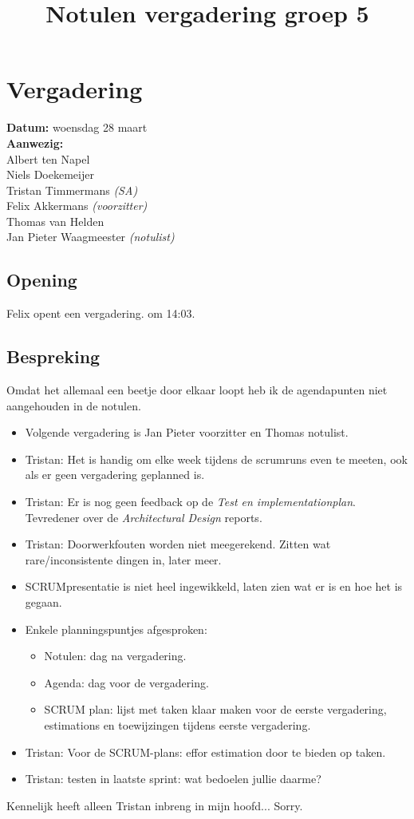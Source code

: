 \documentclass[a4paper]{article}
\title{ Notulen vergadering groep 5 }
\begin{document}
\maketitle

\section*{Vergadering}
{\bf Datum:} woensdag 28 maart \\
{\bf Aanwezig:}\\
Albert ten Napel  \\
Niels Doekemeijer  \\
Tristan Timmermans {\it (SA)} \\
Felix Akkermans {\it (voorzitter)} \\
Thomas van Helden \\
Jan Pieter Waagmeester {\it (notulist)}\\

\subsection*{Opening}
Felix opent een vergadering. om 14:03.

\subsection*{Bespreking}
{\small Omdat het allemaal een beetje door elkaar loopt heb ik de agendapunten niet aangehouden in de notulen.}


\begin{itemize}
	\item Volgende vergadering is Jan Pieter voorzitter en Thomas notulist.
	\item Tristan: Het is handig om elke week tijdens de scrumruns even te meeten, ook als er geen vergadering geplanned is.
	\item Tristan: Er is nog geen feedback op de \textit{Test en implementationplan}. Tevredener over de \textit{Architectural Design} reports.
	\item Tristan: Doorwerkfouten worden niet meegerekend. Zitten wat rare/inconsistente dingen in, later meer.

	\item SCRUMpresentatie is niet heel ingewikkeld, laten zien wat er is en hoe het is gegaan.

	\item Enkele planningspuntjes afgesproken:
	\begin{itemize}
		\item Notulen: dag na vergadering.
		\item Agenda: dag voor de vergadering.
		\item SCRUM plan: lijst met taken klaar maken voor de eerste vergadering, estimations en toewijzingen tijdens eerste vergadering.
	\end{itemize}
	\item Tristan: Voor de SCRUM-plans: effor estimation door te bieden op taken.
	\item Tristan: testen in laatste sprint: wat bedoelen jullie daarme?
\end{itemize}


{\small Kennelijk heeft alleen Tristan inbreng in mijn hoofd... Sorry.}
\end{document}
